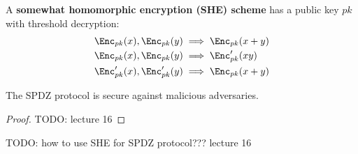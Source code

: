 \begin{defn}[SHE]
A \textbf{somewhat homomorphic encryption (SHE) scheme} has a public key $pk$ with threshold decryption:
\begin{align*}
    \Enc_{pk}(x), \Enc_{pk}(y) &\implies \Enc_{pk}(x + y) \\
    \Enc_{pk}(x), \Enc_{pk}(y) &\implies \Enc'_{pk}(x y) \\
    \Enc'_{pk}(x), \Enc'_{pk}(y) &\implies \Enc_{pk}(x + y) \\
\end{align*}
\end{defn}

\begin{lem}
The SPDZ protocol is secure against malicious adversaries.
\end{lem}
\begin{proof}
TODO: lecture 16
\end{proof}

TODO: how to use SHE for SPDZ protocol??? lecture 16

